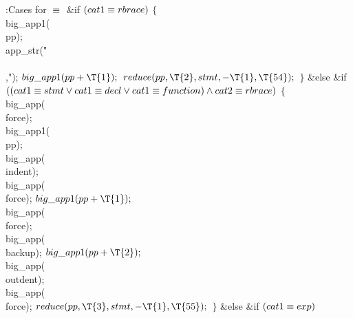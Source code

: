 \B{}:Cases for \X${}\equiv{}$\6
\&{if} ${}(\\{cat1}\equiv\\{rbrace}){}$\5
${}\{{}$\1\6
\\{big\_app1}(\\{pp});\6
\\{app\_str}(\.{"\\\\,"});\6
${}\\{big\_app1}(\\{pp}+\T{1});{}$\6
${}\\{reduce}(\\{pp},\39\T{2},\39\\{stmt},\39{-}\T{1},\39\T{54});{}$\6
\4${}\}{}$\2\6
\&{else} \&{if} ${}((\\{cat1}\E\\{stmt}\V\\{cat1}\E\\{decl}\V\\{cat1}\E%
\\{function})\W\\{cat2}\E\\{rbrace}){}$\5
${}\{{}$\1\6
\\{big\_app}(\\{force});\6
\\{big\_app1}(\\{pp});\6
\\{big\_app}(\\{indent});\6
\\{big\_app}(\\{force});\6
${}\\{big\_app1}(\\{pp}+\T{1});{}$\6
\\{big\_app}(\\{force});\6
\\{big\_app}(\\{backup});\6
${}\\{big\_app1}(\\{pp}+\T{2});{}$\6
\\{big\_app}(\\{outdent});\6
\\{big\_app}(\\{force});\6
${}\\{reduce}(\\{pp},\39\T{3},\39\\{stmt},\39{-}\T{1},\39\T{55});{}$\6
\4${}\}{}$\2\6
\&{else} \&{if} ${}(\\{cat1}\equiv\\{exp}){}$\5
